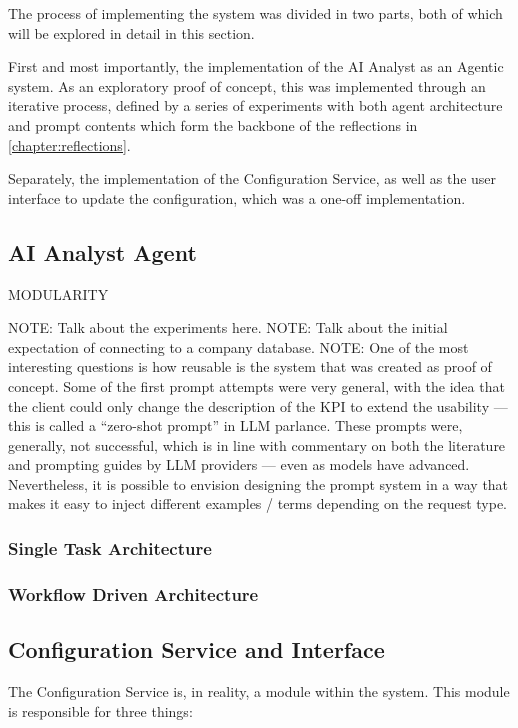 \documentclass[a4paper]{report}
\begin{document}
The process of implementing the system was divided in two parts, both of which will be explored in detail in this section.

First and most importantly, the implementation of the AI Analyst as an Agentic system. As an exploratory proof of concept, this was implemented  through an iterative process, defined by a series of experiments with both agent architecture and prompt contents which form the backbone of the reflections in \autoref{chapter:reflections}.

Separately, the implementation of the Configuration Service, as well as the user interface to update the configuration, which was a one-off implementation.

\subsection{AI Analyst Agent}

MODULARITY

NOTE: Talk about the experiments here.
NOTE: Talk about the initial expectation of connecting to a company database.
NOTE: One of the most interesting questions is how reusable is the system that was created as proof of concept. Some of the first prompt attempts were very general, with the idea that the client could only change the description of the KPI to extend the usability --- this is called a ``zero-shot prompt'' in LLM parlance. These prompts were, generally, not successful, which is in line with commentary on both the literature and prompting guides by LLM providers --- even as models have advanced. Nevertheless, it is possible to envision designing the prompt system in a way that makes it easy to inject different examples / terms depending on the request type.

\subsubsection{Single Task Architecture}

\subsubsection{Workflow Driven Architecture}

\subsection{Configuration Service and Interface}

The Configuration Service is, in reality, a module within the system. This module is responsible for three things:
\end{document}
